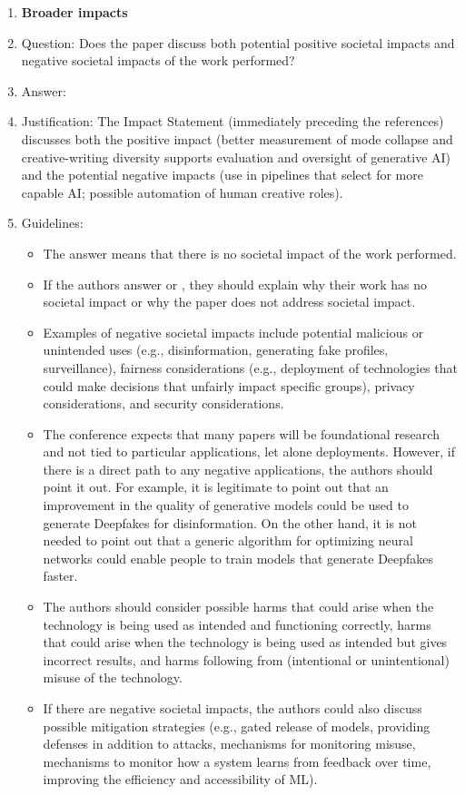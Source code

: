 \begin{enumerate}
\item {\bf Broader impacts}
    \item[] Question: Does the paper discuss both potential positive societal impacts and negative societal impacts of the work performed?
    \item[] Answer: \answerYes{}
    \item[] Justification: The Impact Statement (immediately preceding the references) discusses both the positive impact (better measurement of mode collapse and creative-writing diversity supports evaluation and oversight of generative AI) and the potential negative impacts (use in pipelines that select for more capable AI; possible automation of human creative roles).
    \item[] Guidelines:
    \begin{itemize}
        \item The answer \answerNA{} means that there is no societal impact of the work performed.
        \item If the authors answer \answerNA{} or \answerNo, they should explain why their work has no societal impact or why the paper does not address societal impact.
        \item Examples of negative societal impacts include potential malicious or unintended uses (e.g., disinformation, generating fake profiles, surveillance), fairness considerations (e.g., deployment of technologies that could make decisions that unfairly impact specific groups), privacy considerations, and security considerations.
        \item The conference expects that many papers will be foundational research and not tied to particular applications, let alone deployments. However, if there is a direct path to any negative applications, the authors should point it out. For example, it is legitimate to point out that an improvement in the quality of generative models could be used to generate Deepfakes for disinformation. On the other hand, it is not needed to point out that a generic algorithm for optimizing neural networks could enable people to train models that generate Deepfakes faster.
        \item The authors should consider possible harms that could arise when the technology is being used as intended and functioning correctly, harms that could arise when the technology is being used as intended but gives incorrect results, and harms following from (intentional or unintentional) misuse of the technology.
        \item If there are negative societal impacts, the authors could also discuss possible mitigation strategies (e.g., gated release of models, providing defenses in addition to attacks, mechanisms for monitoring misuse, mechanisms to monitor how a system learns from feedback over time, improving the efficiency and accessibility of ML).
    \end{itemize}


\end{enumerate}
